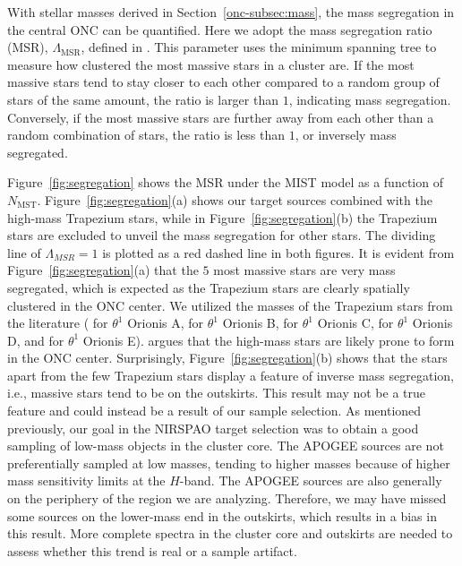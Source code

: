 \documentclass[12pt]{ucsddissertation}
\begin{document}
\begin{CJK*}{UTF8}{gbsn}
With stellar masses derived in Section~\ref{onc-subsec:mass}, the mass segregation in the central ONC can be quantified. Here we adopt the mass segregation ratio (MSR), $\Lambda_\mathrm{MSR}$, defined in \citet{Allison-2009}. This parameter uses the minimum spanning tree to measure how clustered the most massive stars in a cluster are. If the most massive stars tend to stay closer to each other compared to a random group of stars of the same amount, the ratio is larger than $1$, indicating mass segregation. Conversely, if the most massive stars are further away from each other than a random combination of stars, the ratio is less than $1$, or inversely mass segregated.

Figure~\ref{fig:segregation} shows the MSR under the MIST model as a function of $N_\mathrm{MST}$. Figure~\ref{fig:segregation}(a) shows our target sources combined with the high-mass Trapezium stars, while in Figure~\ref{fig:segregation}(b) the Trapezium stars are excluded to unveil the mass segregation for other stars. The dividing line of $\Lambda_{MSR}=1$ is plotted as a red dashed line in both figures. It is evident from Figure~\ref{fig:segregation}(a) that the $5$ most massive stars are very mass segregated, which is expected as the Trapezium stars are clearly spatially clustered in the ONC center.  We utilized the masses of the Trapezium stars from the literature (\citealt{Weigelt-1999, Close-2012} for $\theta^1$ Orionis A, \citealt{Vitrichenko-2006} for $\theta^1$ Orionis B, \cite{Balega-2014} for $\theta^1$ Orionis C, \citealt{Allen-2017} for $\theta^1$ Orionis D, and \citealt{Morales-Calederon-2012} for $\theta^1$ Orionis E). \citet{Hillenbrand-1998} argues that the high-mass stars are likely prone to form in the ONC center. Surprisingly, Figure~\ref{fig:segregation}(b) shows that the stars apart from the few Trapezium stars display a feature of inverse mass segregation, i.e., massive stars tend to be on the outskirts. This result may not be a true feature and could instead be a result of our sample selection. As mentioned previously, our goal in the NIRSPAO target selection was to obtain a good sampling of low-mass objects in the cluster core. The APOGEE sources are not preferentially sampled at low masses, tending to higher masses because of higher mass sensitivity limits at the $H$-band.  The APOGEE sources are also generally on the periphery of the region we are analyzing. Therefore, we may have missed some sources on the lower-mass end in the outskirts, which results in a bias in this result.  More complete spectra in the cluster core and outskirts are needed to assess whether this trend is real or a sample artifact.


\end{CJK*}
\end{document}
